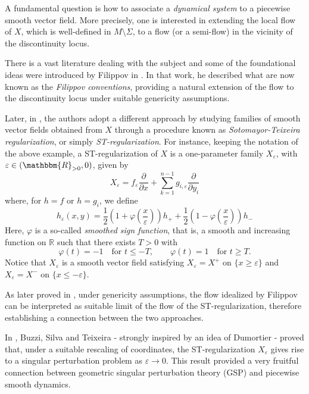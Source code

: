 \documentclass[11pt,psamsfonts]{article}
\theoremstyle{definition}
\theoremstyle{remark}
\newcommand{\cR}{\ensuremath{\mathbbm{R}}}
\newcommand{\eps}{\varepsilon }
\begin{document}
A fundamental question is how to associate a {\em dynamical system} to a piecewise smooth vector field. More precisely, one is interested in extending the local flow of $X$, which is well-defined in $M\setminus \Sigma$, to a flow (or a semi-flow) in the vicinity of the discontinuity locus. 

There is a vast literature dealing with the subject and some of the foundational 
ideas were introduced by Filippov in \cite{AF}. In that work, he described what are now known as the {\em Filippov conventions}, providing a natural extension of the flow to the discontinuity locus under suitable genericity assumptions.  

Later, in \cite{ST}, the authors adopt a different approach by studying families of smooth vector fields obtained from $X$ through a procedure known as {\em Sotomayor-Teixeira regularization}, or simply  {\em ST-regularization}.
For instance, keeping the notation of the above example, a ST-regularization of $X$ is
a one-parameter family $X_{\eps}$, with $\eps \in (\cR_{>0},0)$, given by
\begin{equation}
X_\eps = f_\eps\frac{\partial}{\partial x} + \sum_{k=1}^{n-1} g_{i,\eps} \frac{\partial}{\partial y_i}
\label {regst}
\end{equation}
where, for $h = f$ or $h = g_i$, we define 
$$h_\eps(x,y)=\frac{1}{2}\left(1+\varphi\left(\frac{x}{\eps}\right) \right) h_+ + \frac{1}{2}\left(1-\varphi\left(\frac{x}{\eps}\right) \right)h_-$$
Here, $\varphi$ is a so-called \emph{smoothed sign function}, that is, a smooth
and increasing function on $\mathbb{R}$ such that there exists $T>0$ with
$$
\varphi(t) = -1 \quad \text{for } t \le -T,
\qquad
\varphi(t) = 1 \quad \text{for } t \ge T.
$$
Notice that $X_{\eps}$ is a smooth vector field satisfying $X_{\eps} =  X^+$ on $\{x\geq\eps\}$ and $X_{\eps}=  X^-$ on $\{x\leq-\eps\}$. 

As later proved in \cite{LST5}, under genericity assumptions, the flow idealized by Filippov can be interpreted as suitable limit of the flow of the ST-regularization, therefore establishing a connection between the two approaches.

In \cite{BPT}, Buzzi, Silva and Teixeira - strongly inspired by an idea of Dumortier -   
proved that, under a suitable rescaling of coordinates, the ST-regularization $X_\eps$ gives rise to a singular perturbation problem as $\eps \rightarrow 0$.
This result provided a very fruitful connection between geometric singular perturbation theory (GSP) and piecewise smooth dynamics. 
\end{document}
